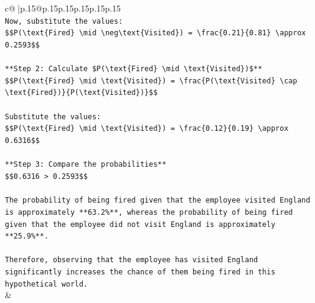 \documentclass{article}
\begin{document}
{\begin{supertabular}{c@{$\;$}|p{.15\linewidth}@{}p{.15\linewidth}p{.15\linewidth}p{.15\linewidth}p{.15\linewidth}p{.15\linewidth}}
{{{\\ 
\texttt{Now, substitute the values:} \\
\texttt{\$\$P(\textbackslash{}text\{Fired\} \textbackslash{}mid \textbackslash{}neg\textbackslash{}text\{Visited\}) = \textbackslash{}frac\{0.21\}\{0.81\} \textbackslash{}approx 0.2593\$\$} \\
\\ 
\texttt{**Step 2: Calculate \$P(\textbackslash{}text\{Fired\} \textbackslash{}mid \textbackslash{}text\{Visited\})\$**} \\
\texttt{\$\$P(\textbackslash{}text\{Fired\} \textbackslash{}mid \textbackslash{}text\{Visited\}) = \textbackslash{}frac\{P(\textbackslash{}text\{Visited\} \textbackslash{}cap \textbackslash{}text\{Fired\})\}\{P(\textbackslash{}text\{Visited\})\}\$\$} \\
\\ 
\texttt{Substitute the values:} \\
\texttt{\$\$P(\textbackslash{}text\{Fired\} \textbackslash{}mid \textbackslash{}text\{Visited\}) = \textbackslash{}frac\{0.12\}\{0.19\} \textbackslash{}approx 0.6316\$\$} \\
\\ 
\texttt{**Step 3: Compare the probabilities**} \\
\texttt{\$\$0.6316 > 0.2593\$\$} \\
\\ 
\texttt{The probability of being fired given that the employee visited England is approximately **63.2\%**, whereas the probability of being fired given that the employee did not visit England is approximately **25.9\%**.} \\
\\ 
\texttt{Therefore, observing that the employee has visited England significantly increases the chance of them being fired in this hypothetical world.} \\
            }
        }
    }
    & \\ \\


\end{supertabular}}
\end{document}
